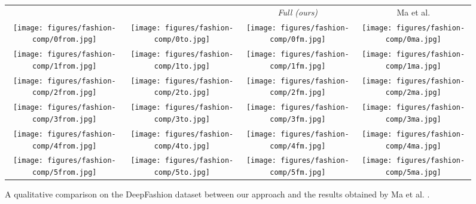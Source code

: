 \documentclass[10pt,twocolumn,letterpaper]{article}
\begin{document}
\begin{figure*}[h]
  \centering
  \setlength\tabcolsep{1.0pt}
\begin{tabular}{cccc}
 &  & \small\emph{Full (ours)}& Ma et al. \cite{ma2017pose}\\ 
\texttt{[image: figures/fashion-comp/0from.jpg]}
&\texttt{[image: figures/fashion-comp/0to.jpg]}
&\texttt{[image: figures/fashion-comp/0fm.jpg]}
&\texttt{[image: figures/fashion-comp/0ma.jpg]}
\\
\texttt{[image: figures/fashion-comp/1from.jpg]}
&\texttt{[image: figures/fashion-comp/1to.jpg]}
&\texttt{[image: figures/fashion-comp/1fm.jpg]}
&\texttt{[image: figures/fashion-comp/1ma.jpg]}
\\
\texttt{[image: figures/fashion-comp/2from.jpg]}
&\texttt{[image: figures/fashion-comp/2to.jpg]}
&\texttt{[image: figures/fashion-comp/2fm.jpg]}
&\texttt{[image: figures/fashion-comp/2ma.jpg]}
\\
\texttt{[image: figures/fashion-comp/3from.jpg]}
&\texttt{[image: figures/fashion-comp/3to.jpg]}
&\texttt{[image: figures/fashion-comp/3fm.jpg]}
&\texttt{[image: figures/fashion-comp/3ma.jpg]}
\\
\texttt{[image: figures/fashion-comp/4from.jpg]}
&\texttt{[image: figures/fashion-comp/4to.jpg]}
&\texttt{[image: figures/fashion-comp/4fm.jpg]}
&\texttt{[image: figures/fashion-comp/4ma.jpg]}\\
\texttt{[image: figures/fashion-comp/5from.jpg]}
&\texttt{[image: figures/fashion-comp/5to.jpg]}
&\texttt{[image: figures/fashion-comp/5fm.jpg]}
&\texttt{[image: figures/fashion-comp/5ma.jpg]}
\end{tabular}
  \caption{A qualitative comparison on the DeepFashion dataset between our approach and the results obtained by Ma et al. \cite{ma2017pose}.}
\label{fig:comparison-Fashion-1}
\end{figure*}
\end{document}
